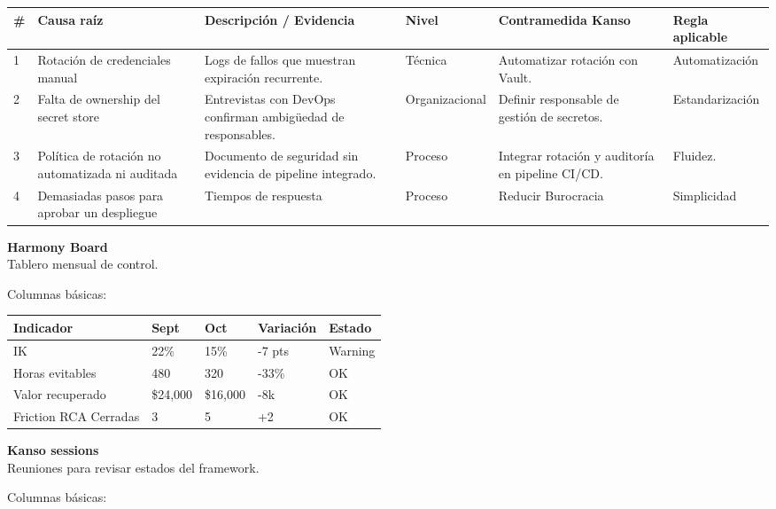 \begin{center}
\scriptsize
\begin{tabular}{|l|p{2.5cm}|p{2.5cm}|l|p{2.5cm}|p{2cm}|}
\hline
\# & Causa raíz & Descripción / Evidencia & Nivel & Contramedida Kanso & Regla aplicable \\ \hline
1 & Rotación de credenciales manual & Logs de fallos que muestran expiración recurrente. & Técnica & Automatizar rotación con Vault. & Automatización \\ \hline
2 & Falta de ownership del secret store & Entrevistas con DevOps confirman ambigüedad de responsables. & Organizacional & Definir responsable de gestión de secretos. & Estandarización \\ \hline
3 & Política de rotación no automatizada ni auditada & Documento de seguridad sin evidencia de pipeline integrado. & Proceso & Integrar rotación y auditoría en pipeline CI/CD. & Fluidez. \\ \hline
4 & Demasiadas pasos para aprobar un despliegue & Tiempos de respuesta & Proceso & Reducir Burocracia & Simplicidad \\ \hline
\end{tabular}
\end{center}


\textbf{Harmony Board} \\ 
Tablero mensual de control.

Columnas básicas:

\begin{center}
\begin{tabular}{|p{3.5cm}|l|l|l|l|}
\hline
Indicador & Sept & Oct & Variación & Estado \\ \hline
IK & 22\% & 15\% & -7 pts & Warning \\ \hline
Horas evitables & 480 & 320 & -33\% & OK \\ \hline
Valor recuperado & \$24,000 & \$16,000 & -8k & OK \\ \hline
Friction RCA Cerradas & 3 & 5 & +2 & OK \\ \hline
\end{tabular}
\end{center}

\textbf{Kanso sessions} \\ 
Reuniones para revisar estados del framework.

Columnas básicas:

